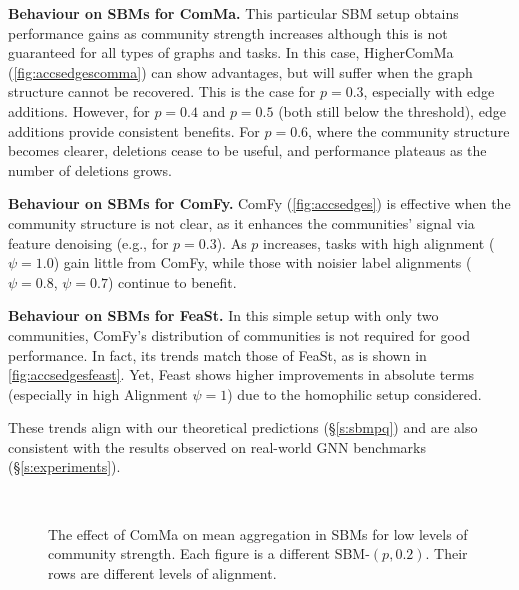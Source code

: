 \textbf{Behaviour on SBMs for ComMa.} This particular SBM setup obtains performance gains as community strength increases \textemdash although this is not guaranteed for all types of graphs and tasks. In this case, HigherComMa (\autoref{fig:accsedgescomma}) can show advantages, but will suffer when the graph structure cannot be recovered. This is the case for $p=0.3$, especially with edge additions. However, for $p=0.4$ and $p=0.5$ (both still below the threshold), edge additions provide consistent benefits. For $p=0.6$, where the community structure becomes clearer, deletions cease to be useful, and performance plateaus as the number of deletions grows.

\textbf{Behaviour on SBMs for ComFy.} ComFy (\autoref{fig:accsedges}) is effective when the community structure is not clear, as it enhances the communities' signal via feature denoising (e.g., for $p=0.3$). As $p$ increases, tasks with high alignment ($\psi=1.0$) gain little from ComFy, while those with noisier label alignments ($\psi=0.8$, $\psi=0.7$) continue to benefit. 

\textbf{Behaviour on SBMs for FeaSt.} In this simple setup with only two communities, ComFy's distribution of communities is not required for good performance. In fact, its trends match those of FeaSt, as is shown in \autoref{fig:accsedgesfeast}. Yet, Feast shows higher improvements in absolute terms (especially in high Alignment $\psi=1$) due to the homophilic setup considered.

These trends align with our theoretical predictions (\S\ref{s:sbmpq}) and are also consistent with the results observed on real-world GNN benchmarks (\S\ref{s:experiments}). 



\begin{figure}[H]
    \centering
    \\
    \caption{The effect of ComMa on mean aggregation in SBMs for low levels of community strength. Each figure is a different SBM-$(p,0.2)$. Their rows are different levels of alignment.}
    \label{fig:accsedgescomma}
\end{figure}



